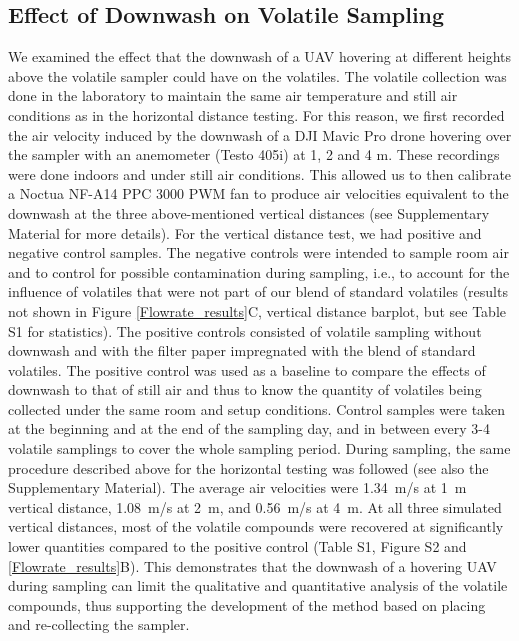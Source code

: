 \subsection{Effect of Downwash on Volatile Sampling}
%
We examined the effect that the downwash of a UAV hovering at different heights above the volatile sampler could have on the volatiles. The volatile collection was done in the laboratory to maintain the same air temperature and still air conditions as in the horizontal distance testing. For this reason, we first recorded the air velocity induced by the downwash of a DJI Mavic Pro drone hovering over the sampler with an anemometer (Testo 405i) at 1, 2 and 4 m. These recordings were done indoors and under still air conditions. This allowed us to then calibrate a Noctua NF-A14 PPC 3000 PWM fan to produce air velocities equivalent to the downwash at the three above-mentioned vertical distances (see Supplementary Material for more details). For the vertical distance test, we had positive and negative control samples. The negative controls were intended to sample room air and to control for possible contamination during sampling, i.e., to account for the influence of volatiles that were not part of our blend of standard volatiles (results not shown in Figure \ref{Flowrate_results}C, vertical distance barplot,  but see Table S1 for statistics). The positive controls consisted of volatile sampling without downwash and with the filter paper impregnated with the blend of standard volatiles. The positive control was used as a baseline to compare the effects of downwash to that of still air and thus to know the quantity of volatiles being collected under the same room and setup conditions. Control samples were taken at the beginning and at the end of the sampling day, and in between every 3-4 volatile samplings to cover the whole sampling period. During sampling, the same procedure described above for the horizontal testing was followed (see also the Supplementary Material). The average air velocities were 1.34~m/s at 1~m vertical distance, 1.08~m/s at 2~m, and 0.56~m/s at 4~m. At all three simulated vertical distances, most of the volatile compounds were recovered at significantly lower quantities compared to the positive control (Table S1, Figure S2 and \ref{Flowrate_results}B). This demonstrates that the downwash of a hovering UAV during sampling can limit the qualitative and quantitative analysis of the volatile compounds, thus supporting the development of the method based on placing and re-collecting the sampler.



